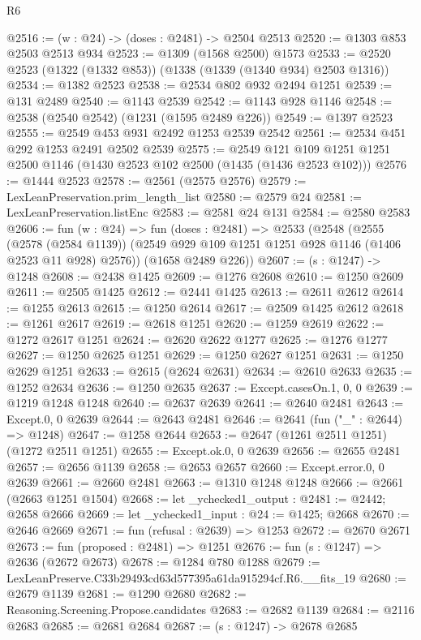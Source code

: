 \begin{lexlean}{R6}
\begin{coremodule}
@2516 := (w : @24) -> (doses : @2481) -> @2504 @2513
@2520 := @1303 @853 @2503 @2513 @934
@2523 := @1309 (@1568 @2500) @1573
@2533 := @2520 @2523 (@1322 (@1332 @853)) (@1338 (@1339 (@1340 @934) @2503 @1316))
@2534 := @1382 @2523
@2538 := @2534 @802 @932 @2494 @1251
@2539 := @131 @2489
@2540 := @1143 @2539
@2542 := @1143 @928 @1146
@2548 := @2538 (@2540 @2542) (@1231 (@1595 @2489 @226))
@2549 := @1397 @2523
@2555 := @2549 @453 @931 @2492 @1253 @2539 @2542
@2561 := @2534 @451 @292 @1253 @2491 @2502 @2539
@2575 := @2549 @121 @109 @1251 @1251 @2500 @1146 (@1430 @2523 @102 @2500 (@1435 (@1436 @2523 @102)))
@2576 := @1444 @2523
@2578 := @2561 (@2575 @2576)
@2579 := LexLeanPreservation.prim_length_list
@2580 := @2579 @24
@2581 := LexLeanPreservation.listEnc
@2583 := @2581 @24 @131
@2584 := @2580 @2583
@2606 := fun (w : @24) =>
  fun (doses : @2481) =>
  @2533
    (@2548
      (@2555
        (@2578 (@2584 @1139))
        (@2549 @929 @109 @1251 @1251 @928 @1146 (@1406 @2523 @11 @928) @2576))
      (@1658 @2489 @226))
@2607 := (s : @1247) -> @1248
@2608 := @2438 @1425
@2609 := @1276 @2608
@2610 := @1250 @2609
@2611 := @2505 @1425
@2612 := @2441 @1425
@2613 := @2611 @2612
@2614 := @1255 @2613
@2615 := @1250 @2614
@2617 := @2509 @1425 @2612
@2618 := @1261 @2617
@2619 := @2618 @1251
@2620 := @1259 @2619
@2622 := @1272 @2617 @1251
@2624 := @2620 @2622 @1277
@2625 := @1276 @1277
@2627 := @1250 @2625 @1251
@2629 := @1250 @2627 @1251
@2631 := @1250 @2629 @1251
@2633 := @2615 (@2624 @2631)
@2634 := @2610 @2633
@2635 := @1252 @2634
@2636 := @1250 @2635
@2637 := Except.casesOn.{1, 0, 0}
@2639 := @1219 @1248 @1248
@2640 := @2637 @2639
@2641 := @2640 @2481
@2643 := Except.{0, 0} @2639
@2644 := @2643 @2481
@2646 := @2641 (fun ("_" : @2644) => @1248)
@2647 := @1258 @2644
@2653 := @2647 (@1261 @2511 @1251) (@1272 @2511 @1251)
@2655 := Except.ok.{0, 0} @2639
@2656 := @2655 @2481
@2657 := @2656 @1139
@2658 := @2653 @2657
@2660 := Except.error.{0, 0} @2639
@2661 := @2660 @2481
@2663 := @1310 @1248 @1248
@2666 := @2661 (@2663 @1251 @1504)
@2668 := let _ychecked1_output : @2481 := @2442; @2658 @2666
@2669 := let _ychecked1_input : @24 := @1425; @2668
@2670 := @2646 @2669
@2671 := fun (refusal : @2639) => @1253
@2672 := @2670 @2671
@2673 := fun (proposed : @2481) => @1251
@2676 := fun (s : @1247) => @2636 (@2672 @2673)
@2678 := @1284 @780 @1288
@2679 := LexLeanPreserve.C33b29493cd63d577395a61da915294cf.R6.__fits_19
@2680 := @2679 @1139
@2681 := @1290 @2680
@2682 := Reasoning.Screening.Propose.candidates
@2683 := @2682 @1139
@2684 := @2116 @2683
@2685 := @2681 @2684
@2687 := (s : @1247) -> @2678 @2685

\end{coremodule}
\end{lexlean}
